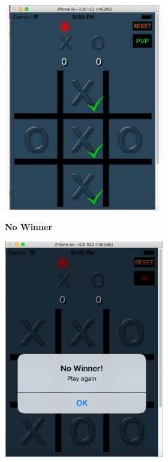\begin{center} 
\includegraphics[width=7cm, height=9cm]{7.eps}
\end{center}
\textbf{No Winner}
\begin{center} 
\includegraphics[width=7cm, height=9.5cm]{8.eps}
\end{center}
\clearpage

